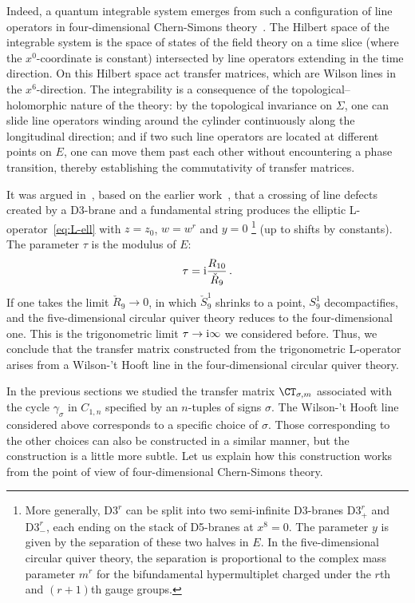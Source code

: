 Indeed, a quantum integrable system emerges from such a configuration
of line operators in four-dimensional Chern-Simons
theory~\cite{Costello:2013zra}.  The Hilbert space of the integrable
system is the space of states of the field theory on a time slice
(where the $x^0$-coordinate is constant) intersected by line operators
extending in the time direction.
On this Hilbert space act transfer
matrices, which are Wilson lines in the $x^6$-direction.
The integrability is a consequence
of the topological--holomorphic nature of the theory: by the
topological invariance on $\Sigma$, one can slide line operators
winding around the cylinder continuously along the longitudinal
direction; and if two such line operators are located at different
points on $E$, one can move them past each other without encountering
a phase transition, thereby establishing the commutativity of transfer
matrices.

It was argued in~\cite{Costello:2018txb}, based on the earlier
work~\cite{Maruyoshi:2016caf,Yagi:2017hmj}, that a crossing of line
defects created by a D3-brane and a fundamental string produces the
elliptic L-operator~\eqref{eq:L-ell} with $z = z_0$, $w = w^r$ and
$y = 0$%
%
\footnote{More generally, $\mathrm{D3}^r$ can be split into two
  semi-infinite D3-branes $\mathrm{D3}^r_+$ and $\mathrm{D3}^r_-$,
  each ending on the stack of D5-branes at $x^8 = 0$.  The parameter
  $y$ is given by the separation of these two halves in $E$.  In the
  five-dimensional circular quiver theory, the separation is
  proportional to the complex mass parameter $m^r$ for the
  bifundamental hypermultiplet charged under the $r$th and $(r+1)$th
  gauge groups.}
%
(up to shifts by constants).  The parameter $\tau$ is the modulus of
$E$:
\begin{equation}
  \tau = \mathrm{i} \frac{R_{10}}{\check{R}_9} \,.
\end{equation}
If one takes the limit $\check{R}_9 \to 0$, in which $\check{S}^1_9$
shrinks to a point, $S^1_9$ decompactifies, and the five-dimensional
circular quiver theory reduces to the four-dimensional one.  This is
the trigonometric limit $\tau \to \mathrm{i}\infty$ we considered before.
Thus, we conclude that the
transfer matrix constructed from the trigonometric L-operator arises
from a Wilson-'t Hooft line in the four-dimensional circular quiver
theory.

In the previous sections we studied the transfer matrix
$\CT_{\sigma,m}$ associated with the cycle $\gamma_\sigma$ in
$C_{1,n}$ specified by an $n$-tuples of signs $\sigma$.  The
Wilson-'t Hooft line considered above corresponds to a specific
choice of $\sigma$.  Those corresponding to the other choices can also
be constructed in a similar manner, but the construction is a little
more subtle.  Let us explain how this construction works from the
point of view of four-dimensional Chern-Simons theory.

